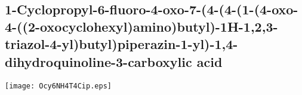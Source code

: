\\[1\baselineskip]
\\[1\baselineskip]

\subsection{1\hyp{}Cyclopropyl\hyp{}6\hyp{}fluoro\hyp{}4\hyp{}oxo\hyp{}7\hyp{}(4\hyp{}(4\hyp{}(1\hyp{}(4\hyp{}oxo\hyp{}4\hyp{}((2\hyp{}oxocyclohexyl)amino)butyl)\hyp{}1H\hyp{}1,2,3\hyp{}triazol\hyp{}4\hyp{}yl)butyl)piperazin\hyp{}1\hyp{}yl)\hyp{}1,4\hyp{}dihydroquinoline\hyp{}3\hyp{}carboxylic acid }


\begin{scheme}[H]
	\begin{center}
		\texttt{[image: Ocy6NH4T4Cip.eps]}
	\end{center}
\end{scheme}

